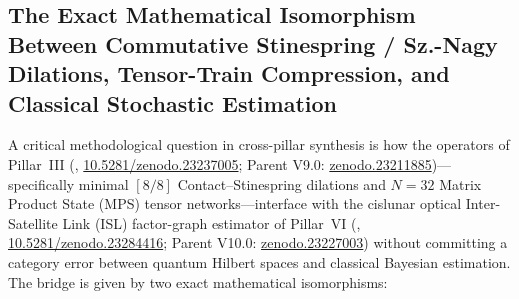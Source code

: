 \documentclass[11pt,a4paper,reqno]{article}
\def\texttt#1{#1}%
\newcommand{\zenodo}[1]{\href{https://doi.org/10.5281/zenodo.#1}{\texttt{10.5281/\allowbreak zenodo.#1}}}
\newcommand{\zenodoshort}[1]{\href{https://doi.org/10.5281/zenodo.#1}{\texttt{zenodo.#1}}}
\theoremstyle{plain}
\theoremstyle{definition}
\theoremstyle{remark}
\numberwithin{equation}{section}
\begin{document}
\subsection{The Exact Mathematical Isomorphism Between Commutative Stinespring / Sz.-Nagy Dilations, Tensor-Train Compression, and Classical Stochastic Estimation}
A critical methodological question in cross-pillar synthesis is how the operators of Pillar~III (\cite{PillarIII_Finite_v10,UnmaniFiniteDim90}, \zenodo{23237005}; Parent V9.0: \zenodoshort{23211885})---specifically minimal $[8/8]$ Contact--Stinespring dilations and $N=32$ Matrix Product State (MPS) tensor networks---interface with the cislunar optical Inter-Satellite Link (ISL) factor-graph estimator of Pillar~VI (\cite{PillarVI_Cislunar_v11,UnmaniPillarVI2026}, \zenodo{23284416}; Parent V10.0: \zenodoshort{23227003}) without committing a category error between quantum Hilbert spaces and classical Bayesian estimation. The bridge is given by two exact mathematical isomorphisms:
\end{document}
